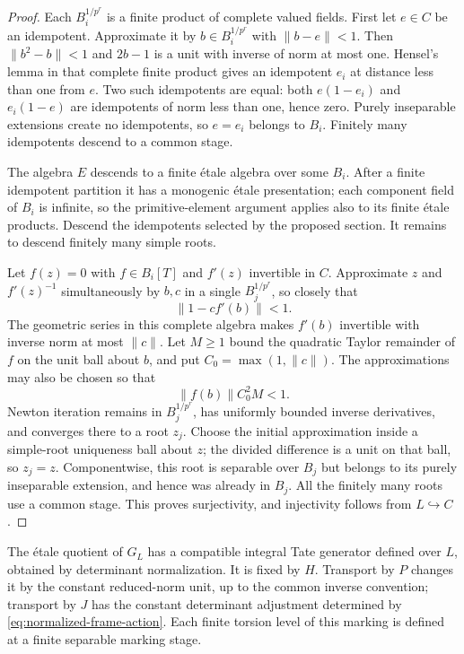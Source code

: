 \begin{proof}
Each $B_i^{1/p^r}$ is a finite product of complete valued fields.
First let $e\in C$ be an idempotent.  Approximate it by
$b\in B_i^{1/p^r}$ with $\lVert b-e\rVert<1$.
Then $\lVert b^2-b\rVert<1$ and $2b-1$ is a unit with inverse
of norm at most one.  Hensel's lemma in that complete finite
product gives an idempotent $e_i$ at distance less than one from
$e$.  Two such idempotents are equal: both $e(1-e_i)$ and
$e_i(1-e)$ are idempotents of norm less than one, hence zero.
Purely inseparable extensions create no idempotents, so $e=e_i$
belongs to $B_i$.  Finitely many idempotents descend to a common
stage.

The algebra $E$ descends to a finite étale algebra over some $B_i$.
After a finite idempotent partition it has a monogenic étale
presentation; each component field of $B_i$ is infinite, so the
primitive-element argument applies also to its finite étale
products.  Descend the idempotents selected by the proposed
section.  It remains to descend finitely many simple roots.

Let $f(z)=0$ with $f\in B_i[T]$ and $f'(z)$ invertible in $C$.
Approximate $z$ and $f'(z)^{-1}$ simultaneously by $b,c$ in a
single $B_j^{1/p^r}$, so closely that
\[
 \lVert1-cf'(b)\rVert<1.
\]
The geometric series in this complete algebra makes $f'(b)$
invertible with inverse norm at most $\lVert c\rVert$.
Let $M\geq1$ bound the quadratic Taylor remainder of $f$ on
the unit ball about $b$, and put $C_0=\max(1,\lVert c\rVert)$.
The approximations may also be chosen so that
\[
 \lVert f(b)\rVert C_0^2M<1.
\]
Newton iteration remains in $B_j^{1/p^r}$, has uniformly bounded
inverse derivatives, and converges there to a root $z_j$.
Choose the initial approximation inside a simple-root uniqueness
ball about $z$; the divided difference is a unit on that ball,
so $z_j=z$.  Componentwise, this root is separable over $B_j$
but belongs to its purely inseparable extension, and hence was
already in $B_j$.  All the finitely many roots use a common
stage.  This proves surjectivity, and injectivity follows from
$L\hookrightarrow C$.
\end{proof}

\begin{lemma}
\label{lem:etale-marking}
The étale quotient of $G_L$ has a compatible integral Tate
generator defined over $L$, obtained by determinant normalization.
It is fixed by $H$.  Transport by $P$ changes it by the constant
reduced-norm unit, up to the common inverse convention; transport
by $J$ has the constant determinant adjustment determined by
\eqref{eq:normalized-frame-action}.  Each finite torsion level
of this marking is defined at a finite separable marking stage.
\end{lemma}

